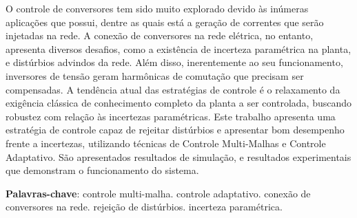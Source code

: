 
	O controle de conversores tem sido muito explorado devido às inúmeras aplicações
	que possui, dentre as quais está a geração de correntes que serão injetadas na
	rede. A conexão de conversores na rede elétrica, no entanto, apresenta diversos
	desafios, como a existência de incerteza paramétrica na planta, e distúrbios
	advindos da rede. Além disso, inerentemente ao seu funcionamento, inversores
	de tensão geram harmônicas de comutação que precisam ser compensadas. A tendência
	atual das estratégias de controle é o relaxamento da exigência clássica de
	conhecimento completo da planta a ser controlada, buscando robustez com relação
	às incertezas paramétricas. Este trabalho apresenta uma estratégia de controle
	capaz de rejeitar distúrbios e apresentar bom desempenho frente a incertezas,
	utilizando técnicas de Controle Multi-Malhas e Controle Adaptativo.
	São apresentados resultados de simulação, e resultados experimentais que
	demonstram o funcionamento do sistema.

 \vspace{\onelineskip}
    
 \noindent
 \textbf{Palavras-chave}: controle multi-malha. controle adaptativo. conexão de conversores na rede.
 	rejeição de distúrbios. incerteza paramétrica.
 